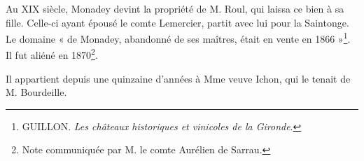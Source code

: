Au XIX\ieme{} siècle, Monadey devint la propriété de M. Roul, qui laissa ce bien à sa fille. Celle-ci ayant épousé le comte Lemercier, partit avec lui pour la Saintonge. Le domaine « de Monadey, abandonné de ses maîtres, était en vente en 1866 »\footnote{GUILLON. \textit{Les châteaux historiques et vinicoles de la Gironde}.}. Il fut aliéné en 1870\footnote{Note communiquée par M. le comte Aurélien de Sarrau.}.

Il appartient depuis une quinzaine d'années à Mme veuve Ichon, qui le tenait de M. Bourdeille.